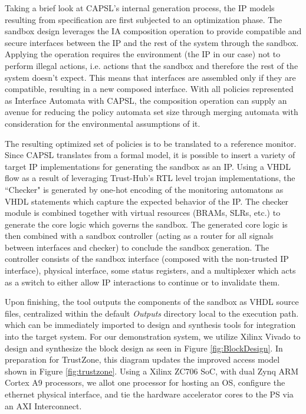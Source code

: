 \documentclass[sigconf]{acmart}
\theoremstyle{plain}
\theoremstyle{remark}
\begin{document}
Taking a brief look at CAPSL's internal generation process, the IP models resulting from specification are first subjected to an optimization phase. The sandbox design leverages the IA composition operation to provide compatible and secure interfaces between the IP and the rest of the system through the sandbox. Applying the operation requires the environment (the IP in our case) not to perform illegal actions, i.e. actions that the sandbox and therefore the rest of the system doesn't expect. This means that interfaces are assembled only if they are compatible, resulting in a new composed interface. With all policies represented as Interface Automata with CAPSL, the composition operation can supply an avenue for reducing the policy automata set size through merging automata with consideration for the environmental assumptions of it.

The resulting optimized set of policies is to be translated to a reference monitor. Since CAPSL translates from a formal model, it is possible to insert a variety of target IP implementations for generating the sandbox as an IP. Using a VHDL flow as a result of leveraging Trust-Hub's RTL level trojan implementations, the ``Checker" is generated by one-hot encoding of the monitoring automatons as VHDL statements which capture the expected behavior of the IP. The checker module is combined together with virtual resources (BRAMs, SLRs, etc.) to generate the core logic which governs the sandbox. The generated core logic is then combined with a sandbox controller (acting as a router for all signals between interfaces and checker) to conclude the sandbox generation. The controller consists of the sandbox interface (composed with the non-trusted IP interface), physical interface, some status registers, and a multiplexer which acts as a switch to either allow IP interactions to continue or to invalidate them.

Upon finishing, the tool outputs the components of the sandbox as VHDL source files, centralized within the default \textit{Outputs} directory local to the execution path. which can be immediately imported to design and synthesis tools for integration into the target system. For our demonstration system, we utilize Xilinx Vivado to design and synthesize the block design as seen in Figure \ref{fig:BlockDesign}. In preparation for TrustZone, this diagram updates the improved access model shown in Figure \ref{fig:trustzone}. Using a Xilinx ZC706 SoC, with dual Zynq ARM Cortex A9 processors, we allot one processor for hosting an OS, configure the ethernet physical interface, and tie the hardware accelerator cores to the PS via an AXI Interconnect.
\end{document}
